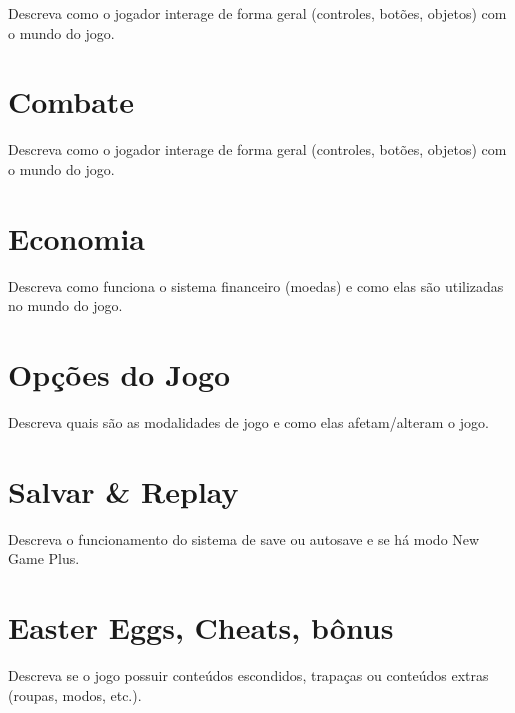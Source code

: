 Descreva como o jogador interage de forma geral (controles, botões, objetos) com o mundo do jogo.

\section{Combate}

Descreva como o jogador interage de forma geral (controles, botões, objetos) com o mundo do jogo.

\section{Economia}

Descreva como funciona o sistema financeiro (moedas) e como elas são utilizadas no mundo do jogo.

\section{Opções do Jogo}

Descreva quais são as modalidades de jogo e como elas afetam/alteram o jogo.

\section{Salvar \& Replay}

Descreva o funcionamento do sistema de save ou autosave e se há modo New Game Plus.

\section{Easter Eggs, Cheats, bônus}

Descreva se o jogo possuir conteúdos escondidos, trapaças ou conteúdos extras (roupas, modos, etc.).